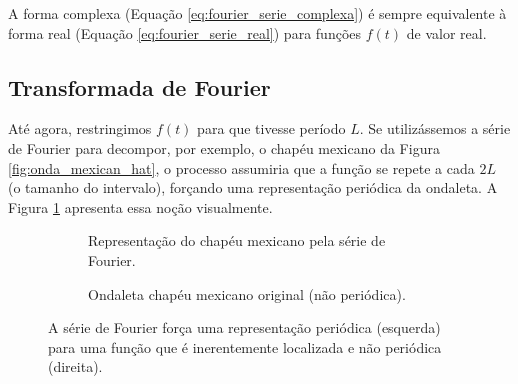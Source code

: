 A forma complexa (Equação \ref{eq:fourier_serie_complexa}) é sempre equivalente à forma real (Equação \ref{eq:fourier_serie_real}) para funções \(f(t)\) de valor real. 

\subsection{Transformada de Fourier}\label{sec:fourier_transform} 
Até agora, restringimos \(f(t)\) para que tivesse período \(L\). Se utilizássemos a série de Fourier para decompor, por exemplo, o chapéu mexicano da Figura \ref{fig:onda_mexican_hat}, o processo assumiria que a função se repete a cada \(2L\) (o tamanho do intervalo), forçando uma representação periódica da ondaleta. A Figura \ref{fig:fourier_series_mexican_hat} apresenta essa noção visualmente. 

\begin{figure}[!ht]
	\centering
	\begin{subfigure}{0.48\textwidth}
		\centering
	    \caption{Representação do chapéu mexicano pela série de Fourier.}
	    \label{fig:fourier_series_mexican_hat}
	\end{subfigure}
	\hfill 
	\begin{subfigure}{0.48\textwidth}
	    \centering
	    \caption{Ondaleta chapéu mexicano original (não periódica).}
	    \label{fig:mexican_hat}
	\end{subfigure}
	\caption{A série de Fourier força uma representação periódica (esquerda) para uma função que é inerentemente localizada e não periódica (direita).}
	\label{fig:fig_2_fourier_mexican_hat}
\end{figure}

